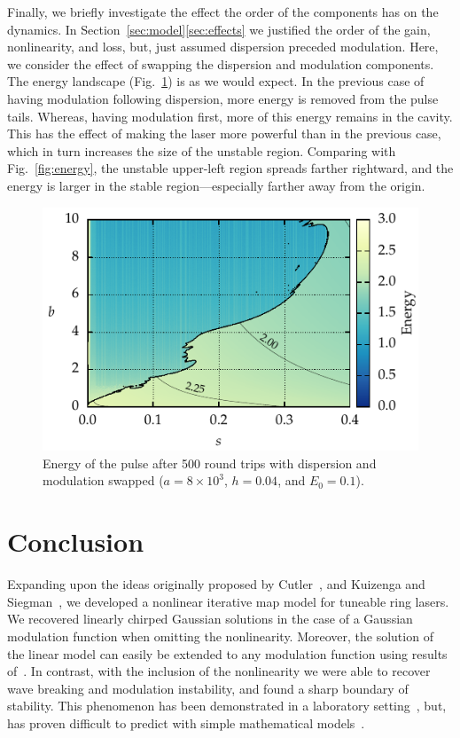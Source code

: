 \documentclass[9pt,twocolumn,twoside]{osajnl}
\begin{document}
Finally, we briefly investigate the effect the order of the components has on the dynamics. In Section~\ref{sec:model}\ref{sec:effects} we justified the order of the gain, nonlinearity, and loss, but, just assumed dispersion preceded modulation. Here, we consider the effect of swapping the dispersion and modulation components. The energy landscape (Fig.~\ref{fig:energyswitch}) is as we would expect. In the previous case of having modulation following dispersion, more energy is removed from the pulse tails. Whereas, having modulation first, more of this energy remains in the cavity. This has the effect of making the laser more powerful than in the previous case, which in turn increases the size of the unstable region. Comparing with Fig.~\ref{fig:energy}, the unstable upper-left region spreads farther rightward, and the energy is larger in the stable region---especially farther away from the origin.

\begin{figure}[tbp]
	\centering
	\includegraphics{Figures/ParamSpaceEnergySwitch}
	\caption{Energy of the pulse after 500 round trips with dispersion and modulation swapped ($a = 8 \times 10^3$, $h = 0.04$, and $E_0 = 0.1$).}
	\label{fig:energyswitch}
\end{figure}

\section{Conclusion}
\label{sec:conclusion}
Expanding upon the ideas originally proposed by Cutler~\cite{cutler1955}, and Kuizenga and Siegman~\cite{kuizenga1970, kuizenga1970a, siegman1969}, we developed a nonlinear iterative map model for tuneable ring lasers. We recovered linearly chirped Gaussian solutions in the case of a Gaussian modulation function when omitting the nonlinearity. Moreover, the solution of the linear model can easily be extended to any modulation function using results of~\cite{calcaterra2008a}. In contrast, with the inclusion of the nonlinearity we were able to recover wave breaking and modulation instability, and found a sharp boundary of stability. This phenomenon has been demonstrated in a laboratory setting~\cite{agrawal2013, anderson1992, finot2008, rothenberg1989b, tomlinson1985}, but, has proven difficult to predict with simple mathematical models~\cite{meng2020}.
\end{document}
